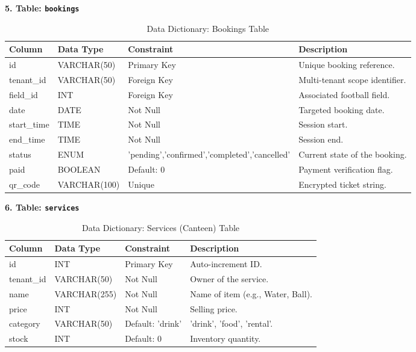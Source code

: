 \textbf{5. Table: \texttt{bookings}}
\begin{table}[htbp]
\centering
\begin{tabularx}{\textwidth}{|l|l|l|X|}
\hline
\rowcolor{LightCyan}
\textbf{Column} & \textbf{Data Type} & \textbf{Constraint} & \textbf{Description} \\ \hline
id & VARCHAR(50) & Primary Key & Unique booking reference. \\ \hline
tenant\_id & VARCHAR(50) & Foreign Key & Multi-tenant scope identifier. \\ \hline
field\_id & INT & Foreign Key & Associated football field. \\ \hline
date & DATE & Not Null & Targeted booking date. \\ \hline
start\_time & TIME & Not Null & Session start. \\ \hline
end\_time & TIME & Not Null & Session end. \\ \hline
status & ENUM & 'pending','confirmed','completed','cancelled' & Current state of the booking. \\ \hline
paid & BOOLEAN & Default: 0 & Payment verification flag. \\ \hline
qr\_code & VARCHAR(100) & Unique & Encrypted ticket string. \\ \hline
\end{tabularx}
\caption{Data Dictionary: Bookings Table}
\end{table}

\textbf{6. Table: \texttt{services}}
\begin{table}[htbp]
\centering
\begin{tabularx}{\textwidth}{|l|l|l|X|}
\hline
\rowcolor{LightCyan}
\textbf{Column} & \textbf{Data Type} & \textbf{Constraint} & \textbf{Description} \\ \hline
id & INT & Primary Key & Auto-increment ID. \\ \hline
tenant\_id & VARCHAR(50) & Not Null & Owner of the service. \\ \hline
name & VARCHAR(255) & Not Null & Name of item (e.g., Water, Ball). \\ \hline
price & INT & Not Null & Selling price. \\ \hline
category & VARCHAR(50) & Default: 'drink' & 'drink', 'food', 'rental'. \\ \hline
stock & INT & Default: 0 & Inventory quantity. \\ \hline
\end{tabularx}
\caption{Data Dictionary: Services (Canteen) Table}
\end{table}

